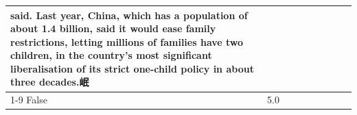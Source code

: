 \begin{table}[H]
\begin{tabular}{lllrlllll}
said. Last year, China, which has a population of about 1.4 billion, said it would ease family restrictions, letting millions of families have two children, in the country's most significant liberalisation of its strict one-child policy in about three decades.岷 \\
\cline{1-9}
False & 5.0%
\end{tabular}
\end{table}
